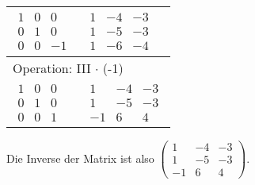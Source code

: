 \begin{longtable}{p{4cm}|p{3cm}}
    $\displaystyle\begin{matrix}
        1 & 0 & 0 \\
        0 & 1 & 0 \\
        0 & 0 & -1
    \end{matrix}$&
    $\displaystyle\begin{matrix}
        1 & -4 & -3 \\
        1 & -5 & -3 \\
        1 & -6 & -4
    \end{matrix}$\\\hline

    \multicolumn{2}{p{\dimexpr4cm+3cm+2\tabcolsep\relax}}{Operation: III $\cdot$ (-1)} \\\hline\pagebreak[0]

    $\displaystyle\begin{matrix}
        1 & 0 & 0 \\
        0 & 1 & 0 \\
        0 & 0 & 1
    \end{matrix}$&
    $\displaystyle\begin{matrix}
        1 & -4 & -3 \\
        1 & -5 & -3 \\
        -1 & 6 & 4
    \end{matrix}$\\\hline
\end{longtable}

Die Inverse der Matrix ist also $\begin{pmatrix}
    1 & -4 & -3 \\
    1 & -5 & -3 \\
    -1 & 6 & 4
\end{pmatrix}.$